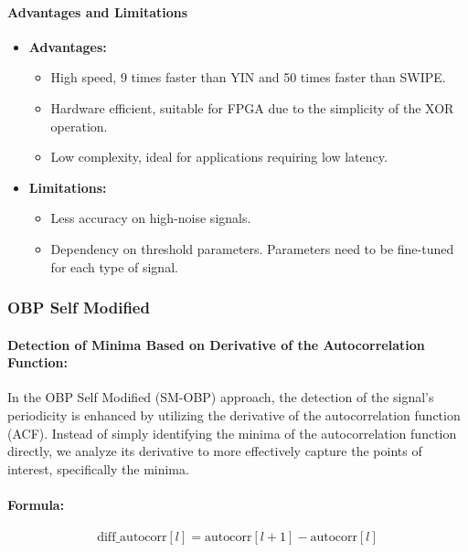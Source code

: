 \documentclass{ieeeaccess}
\begin{document}
\paragraph{Advantages and Limitations}
\begin{itemize}
    \item[] \textbf{Advantages:}
    \begin{itemize}
        \item High speed, 9 times faster than YIN and 50 times faster than SWIPE.
        \item Hardware efficient, suitable for FPGA due to the simplicity of the XOR operation.
        \item Low complexity, ideal for applications requiring low latency.
    \end{itemize}

    \item[] \textbf{Limitations:}
    \begin{itemize}
        \item Less accuracy on high-noise signals.
        \item Dependency on threshold parameters. Parameters need to be fine-tuned for each type of signal.
    \end{itemize}
\end{itemize}

\subsubsection{OBP Self Modified}

\paragraph{Detection of Minima Based on Derivative of the Autocorrelation Function:}
In the OBP Self Modified (SM-OBP) approach, the detection of the signal's periodicity is enhanced by utilizing the derivative of the autocorrelation function (ACF). Instead of simply identifying the minima of the autocorrelation function directly, we analyze its derivative to more effectively capture the points of interest, specifically the minima.

\paragraph{Formula:}
\begin{equation}
\text{diff\_autocorr}[l] = \text{autocorr}[l+1] - \text{autocorr}[l]
\label{eq:diff_autocorr}
\end{equation}
\end{document}
